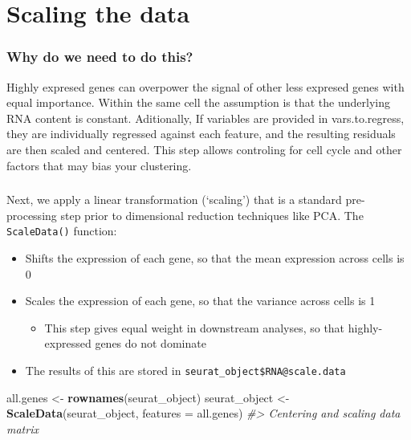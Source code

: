 \documentclass[
]{book}
\newenvironment{Shaded}{\begin{snugshade}}{\end{snugshade}}
\newcommand{\AttributeTok}[1]{\textcolor[rgb]{0.13,0.29,0.53}{#1}}
\newcommand{\CommentTok}[1]{\textcolor[rgb]{0.56,0.35,0.01}{\textit{#1}}}
\newcommand{\FunctionTok}[1]{\textcolor[rgb]{0.13,0.29,0.53}{\textbf{#1}}}
\newcommand{\NormalTok}[1]{#1}
\newcommand{\OtherTok}[1]{\textcolor[rgb]{0.56,0.35,0.01}{#1}}
\providecommand{\tightlist}{%
  \setlength{\itemsep}{0pt}\setlength{\parskip}{0pt}}
\begin{document}
\section{Scaling the data}\label{scaling-the-data}

\subsubsection*{Why do we need to do this?}\label{why-do-we-need-to-do-this-3}

Highly expresed genes can overpower the signal of other less expresed genes with equal importance. Within the same cell the assumption is that the underlying RNA content is constant. Aditionally, If variables are provided in vars.to.regress, they are individually regressed against each feature, and the resulting residuals are then scaled and centered. This step allows controling for cell cycle and other factors that may bias your clustering.

\subsubsection*{}\label{section-6}

Next, we apply a linear transformation (`scaling') that is a standard pre-processing step prior to dimensional reduction techniques like PCA. The \texttt{ScaleData()} function:

\begin{itemize}
\tightlist
\item
  Shifts the expression of each gene, so that the mean expression across cells is 0
\item
  Scales the expression of each gene, so that the variance across cells is 1

  \begin{itemize}
  \tightlist
  \item
    This step gives equal weight in downstream analyses, so that highly-expressed genes do not dominate
  \end{itemize}
\item
  The results of this are stored in \texttt{seurat\_object\$RNA@scale.data}
\end{itemize}

\begin{Shaded}
\begin{Highlighting}[]
\NormalTok{all.genes }\OtherTok{\textless{}{-}} \FunctionTok{rownames}\NormalTok{(seurat\_object)}
\NormalTok{seurat\_object }\OtherTok{\textless{}{-}} \FunctionTok{ScaleData}\NormalTok{(seurat\_object, }\AttributeTok{features =}\NormalTok{ all.genes)}
\CommentTok{\#\textgreater{} Centering and scaling data matrix}
\end{Highlighting}
\end{Shaded}
\end{document}
